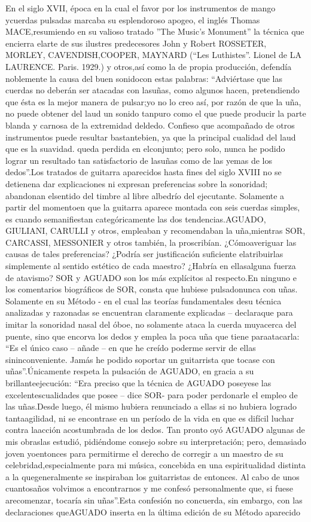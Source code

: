 \documentclass[
11pt, %
a4paper, %
oneside, %
headinclude,footinclude, %
BCOR5mm, %
]{scrartcl}
\begin{document}
{En el siglo XVII, época en la cual el favor por los instrumentos de mango ycuerdas pulsadas marcaba su esplendoroso apogeo, el inglés Thomas MACE,resumiendo en su valioso tratado ”The Music's Monument” la técnica que encierra elarte de sus ilustres predecesores John y Robert ROSSETER, MORLEY, CAVENDISH,COOPER, MAYNARD (“Les Luthistes”. Lionel de LA LAURENCE. Paris. 1929.) y otros,así como la de propia producción, defendía noblemente la causa del buen sonidocon estas palabras: “Adviértase que las cuerdas no deberán ser atacadas con lasuñas, como algunos hacen, pretendiendo que ésta es la mejor manera de pulsar;yo no lo creo así, por razón de que la uña, no puede obtener del laud un sonido tanpuro como el que puede producir la parte blanda y carnosa de la extremidad deldedo. Confieso que acompañado de otros instrumentos puede resultar bastantebien, ya que la principal cualidad del laud que es la suavidad. queda perdida en elconjunto; pero solo, nunca he podido lograr un resultado tan satisfactorio de lasuñas como de las yemas de los dedos”.Los tratados de guitarra aparecidos hasta fines del siglo XVIII no se detienena dar explicaciones ni expresan preferencias sobre la sonoridad; abandonan elsentido del timbre al libre albedrío del ejecutante. Solamente a partir del momentoen que la guitarra aparece montada con seis cuerdas simples, es cuando semanifiestan categóricamente las dos tendencias.AGUADO, GIULIANI, CARULLI y otros, empleaban y recomendaban la uña,mientras SOR, CARCASSI, MESSONIER y otros también, la proscribían. ¿Cómoaveriguar las causas de tales preferencias? ¿Podría ser justificación suficiente elatribuirlas simplemente al sentido estético de cada maestro? ¿Habría en ellasalguna fuerza de atavismo? SOR y AGUADO son los más explícitos al respecto.En ninguno e los comentarios biográficos de SOR, consta que hubiese pulsadonunca con uñas. Solamente en su Método - en el cual las teorías fundamentales desu técnica analizadas y razonadas se encuentran claramente explicadas – declaraque para imitar la sonoridad nasal del óboe, no solamente ataca la cuerda muyacerca del puente, sino que encorva los dedos y emplea la poca uña que tiene paraatacarla: “Es el único caso – añade – en que he creído poderme servir de ellas sininconveniente. Jamás he podido soportar un guitarrista que tocase con uñas”.Únicamente respeta la pulsación de AGUADO, en gracia a su brillanteejecución: “Era preciso que la técnica de AGUADO poseyese las excelentescualidades que posee – dice SOR- para poder perdonarle el empleo de las uñas.Desde luego, él mismo hubiera renunciado a ellas si no hubiera logrado tantaagilidad, ni se encontrase en un período de la vida en que es difícil luchar contra laacción acostumbrada de los dedos. Tan pronto oyó AGUADO algunas de mis obraslas estudió, pidiéndome consejo sobre su interpretación; pero, demasiado joven yoentonces para permitirme el derecho de corregir a un maestro de su celebridad,especialmente para mi música, concebida en una espiritualidad distinta a la quegeneralmente se inspiraban los guitarristas de entonces. Al cabo de unos cuantosaños volvimos a encontrarnos y me confesó personalmente que, si fuese arecomenzar, tocaría sin uñas”.Esta confesión no concuerda, sin embargo, con las declaraciones queAGUADO inserta en la última edición de su Método aparecido }
\end{document}
